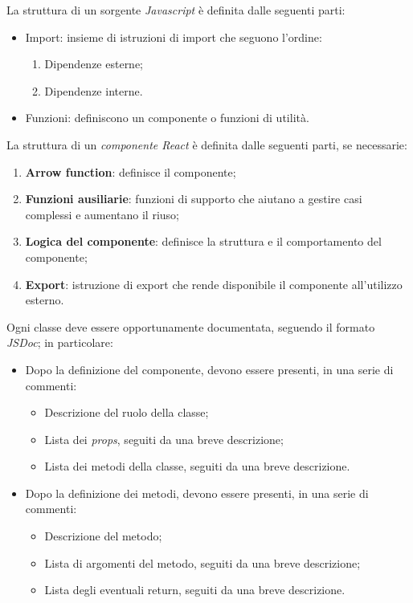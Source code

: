 \documentclass[10pt, a4paper]{article}
\begin{document}
 La struttura di un sorgente \textit{Javascript\pg} è definita dalle seguenti parti:
\begin{itemize}
    \item Import: insieme di istruzioni di import che seguono l'ordine:
    \begin{enumerate}
        \item Dipendenze esterne;
        \item Dipendenze interne.
    \end{enumerate}
    \item Funzioni: definiscono un componente o funzioni di utilità.
\end{itemize}
 La struttura di un \textit{componente React\pg} è definita dalle seguenti parti, se necessarie:
\begin{enumerate}
    \item \textbf{Arrow function}: definisce il componente;
    \item \textbf{Funzioni ausiliarie}: funzioni di supporto che aiutano a gestire casi complessi e aumentano il riuso;
    \item \textbf{Logica del componente}: definisce la struttura e il comportamento del componente;
    \item \textbf{Export}: istruzione di export che rende disponibile il componente all'utilizzo esterno.
\end{enumerate}
Ogni classe deve essere opportunamente documentata, seguendo il formato \textit{JSDoc\pg}; in particolare:
\begin{itemize}
    \item Dopo la definizione del componente, devono essere presenti, in una serie di commenti:
    \begin{itemize}
        \item Descrizione del ruolo della classe;
        \item Lista dei \textit{props\pg}, seguiti da una breve descrizione;
        \item Lista dei metodi della classe, seguiti da una breve descrizione.
    \end{itemize}
    \item Dopo la definizione dei metodi, devono essere presenti, in una serie di commenti:
    \begin{itemize}
        \item Descrizione del metodo;
        \item Lista di argomenti del metodo, seguiti da una breve descrizione;
        \item Lista degli eventuali return, seguiti da una breve descrizione.
    \end{itemize}
\end{itemize}
\end{document}
